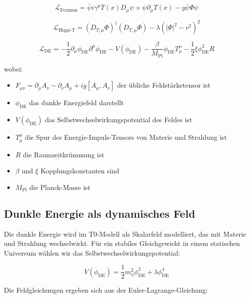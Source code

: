 \documentclass[a4paper,12pt]{article}
\theoremstyle{definition}
\theoremstyle{remark}
\newcommand{\Tfield}{T(x)} %
\newcommand{\DcovT}[1]{\Tfield D_\mu #1 + #1 \partial_\mu \Tfield}
\begin{document}
	\begin{equation}
		\mathcal{L}_{\text{Fermion}} = \bar{\psi}i\gamma^\mu \DcovT{\psi} - y\bar{\psi}\Phi\psi
	\end{equation}
	
	\begin{equation}
		\mathcal{L}_{\text{Higgs-T}} = (D_{T,\mu}\Phi)^\dagger (D_{T,\mu}\Phi) - \lambda(|\Phi|^2 - v^2)^2
	\end{equation}
	
	\begin{equation}
		\mathcal{L}_{\text{DE}} = -\frac{1}{2}\partial_\mu \phi_{\text{DE}} \partial^\mu \phi_{\text{DE}} - V(\phi_{\text{DE}}) - \frac{\beta}{M_{\text{Pl}}} \phi_{\text{DE}} T^{\mu}_{\mu} - \frac{1}{2}\xi \phi_{\text{DE}}^2 R
	\end{equation}
	
	wobei:
	\begin{itemize}
		\item $F_{\mu\nu} = \partial_\mu A_\nu - \partial_\nu A_\mu + ig[A_\mu, A_\nu]$ der übliche Feldstärketensor ist
		\item $\phi_{\text{DE}}$ das dunkle Energiefeld darstellt
		\item $V(\phi_{\text{DE}})$ das Selbstwechselwirkungspotential des Feldes ist
		\item $T^{\mu}_{\mu}$ die Spur des Energie-Impuls-Tensors von Materie und Strahlung ist
		\item $R$ die Raumzeitkrümmung ist
		\item $\beta$ und $\xi$ Kopplungskonstanten sind
		\item $M_{\text{Pl}}$ die Planck-Masse ist
	\end{itemize}
	
	\subsection{Dunkle Energie als dynamisches Feld}
	
	Die dunkle Energie wird im T0-Modell als Skalarfeld modelliert, das mit Materie und Strahlung wechselwirkt. Für ein stabiles Gleichgewicht in einem statischen Universum wählen wir das Selbstwechselwirkungspotential:
	
	\begin{equation}
		V(\phi_{\text{DE}}) = \frac{1}{2}m_{\phi}^2\phi_{\text{DE}}^2 + \lambda \phi_{\text{DE}}^4
	\end{equation}
	
	Die Feldgleichungen ergeben sich aus der Euler-Lagrange-Gleichung:
	
\end{document}
